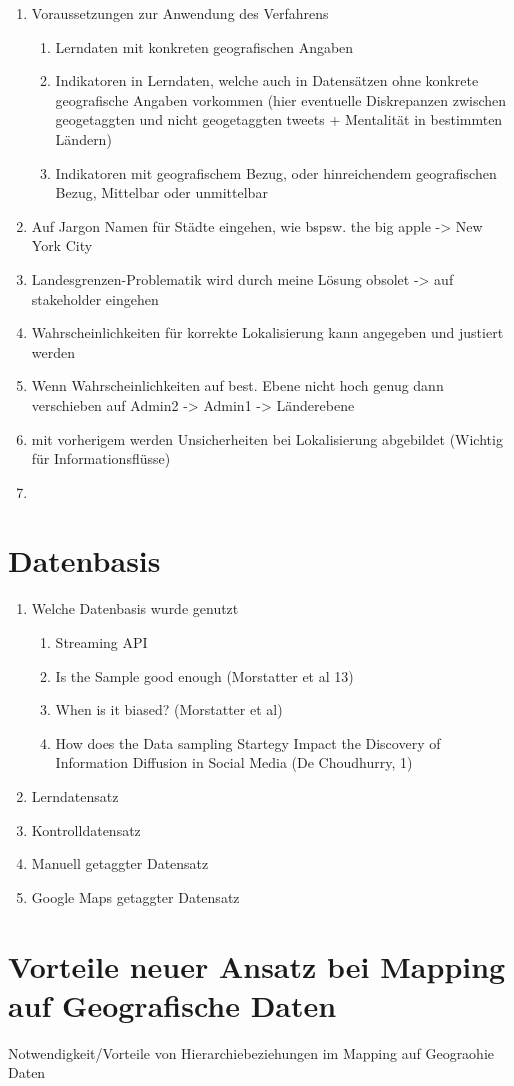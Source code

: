 	\begin{enumerate}
		\item {} Voraussetzungen zur Anwendung des Verfahrens
		\begin{enumerate}
			\item Lerndaten mit konkreten geografischen Angaben
			\item Indikatoren in Lerndaten, welche auch in Datensätzen ohne konkrete geografische Angaben vorkommen (hier eventuelle Diskrepanzen zwischen geogetaggten und nicht geogetaggten tweets + Mentalität in bestimmten Ländern)
			\item Indikatoren mit geografischem Bezug, oder hinreichendem geografischen Bezug, Mittelbar oder unmittelbar
		 \end{enumerate}
		 \item Auf Jargon Namen für Städte eingehen, wie bspsw. the big apple -> New York City 
		 \item Landesgrenzen-Problematik wird durch meine Lösung obsolet -> auf stakeholder eingehen
		 \item {} Wahrscheinlichkeiten für korrekte Lokalisierung kann angegeben und justiert werden 
		 \item Wenn Wahrscheinlichkeiten auf best. Ebene nicht hoch genug dann verschieben auf Admin2 -> Admin1 -> Länderebene
		 \item mit vorherigem werden Unsicherheiten bei Lokalisierung abgebildet (Wichtig für Informationsflüsse) 
		 \item  
	\end{enumerate}


	\section{Datenbasis}
		\begin{enumerate}
			\item Welche Datenbasis wurde genutzt 
				\begin{enumerate}
					\item Streaming API
					\item Is the Sample good enough (Morstatter et al 13)
					\item When is it biased? (Morstatter et al)
					\item How does the Data sampling Startegy Impact the Discovery of Information Diffusion in Social Media (De Choudhurry, 1)
				\end{enumerate}
			\item Lerndatensatz
			\item Kontrolldatensatz
			\item Manuell getaggter Datensatz
			\item Google Maps getaggter Datensatz
		\end{enumerate}			
	 
	 \section{Vorteile neuer Ansatz bei Mapping auf Geografische Daten}	
	Notwendigkeit/Vorteile von Hierarchiebeziehungen im Mapping auf Geograohie Daten
